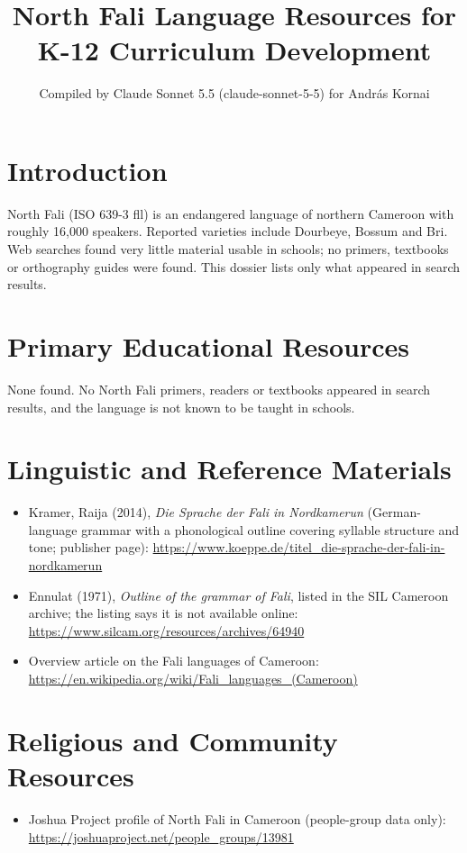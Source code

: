 \documentclass[12pt]{article}
\title{North Fali Language Resources for K-12 Curriculum Development}
\author{Compiled by Claude Sonnet 5.5 (claude-sonnet-5-5) for Andr\'as Kornai}
\date{}
\begin{document}
\maketitle

\section{Introduction}
North Fali (ISO 639-3 fll) is an endangered language of northern Cameroon with roughly 16,000 speakers. Reported varieties include Dourbeye, Bossum and B\textschwa ri. Web searches found very little material usable in schools; no primers, textbooks or orthography guides were found. This dossier lists only what appeared in search results.

\section{Primary Educational Resources}
None found. No North Fali primers, readers or textbooks appeared in search results, and the language is not known to be taught in schools.

\section{Linguistic and Reference Materials}
\begin{itemize}
\item Kramer, Raija (2014), \emph{Die Sprache der Fali in Nordkamerun} (German-language grammar with a phonological outline covering syllable structure and tone; publisher page): \url{https://www.koeppe.de/titel_die-sprache-der-fali-in-nordkamerun}
\item Ennulat (1971), \emph{Outline of the grammar of Fali}, listed in the SIL Cameroon archive; the listing says it is not available online: \url{https://www.silcam.org/resources/archives/64940}
\item Overview article on the Fali languages of Cameroon: \url{https://en.wikipedia.org/wiki/Fali_languages_(Cameroon)}
\end{itemize}

\section{Religious and Community Resources}
\begin{itemize}
\item Joshua Project profile of North Fali in Cameroon (people-group data only): \url{https://joshuaproject.net/people_groups/13981}
\end{itemize}
\end{document}
